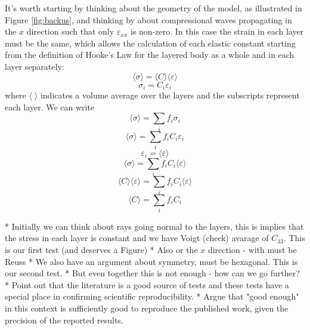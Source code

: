 \documentclass[11pt, oneside]{article}   	%
\begin{document}
It's worth starting by thinking about the geometry of the model, as illustrated in Figure \ref{fig:backus}, 
and thinking by about compressional waves propagating in the $x$ direction such that only $\varepsilon_{xx}$
is non-zero. In this case the strain in each layer must be the same, which allows the calculation of each
elastic constant starting from the definition of Hooke's Law for the layered body as a whole and in each layer separately:
\begin{equation}
\langle \sigma \rangle = \langle C \rangle \langle \varepsilon \rangle
\end{equation}
\begin{equation}
\sigma_i = C_i \varepsilon_i
\end{equation}
where $\langle \; \rangle$ indicates a volume average over the layers and the subscripts represent each layer. 
We can write 
\begin{equation}
\langle \sigma \rangle = \sum_i f_i \sigma_i
\end{equation}
\begin{equation}
\langle \sigma \rangle = \sum_i f_i C_i \varepsilon_i
\end{equation}
\begin{equation}
\varepsilon_i =  \langle \varepsilon \rangle
\end{equation}
\begin{equation}
\langle \sigma \rangle = \sum_i f_i C_i \langle \varepsilon \rangle
\end{equation}
\begin{equation}
\langle C \rangle \langle \varepsilon \rangle = \sum_i f_i C_i \langle \varepsilon \rangle
\end{equation}
\begin{equation}
\langle C \rangle = \sum_i f_i C_i 
\end{equation}

* Initially we can think about rays going normal to the layers, this is 
implies that the stress in each layer is constant and we have Voigt (check)
avarage of $C_{33}$. This is our first test (and deserves a Figure)
* Also or the $x$ direction - with must be Reuss
* We also have an argument about symmetry, must be hexagonal. This is our
second test.
* But even together this is not enough - how can we go further?
* Point out that the literature is a good source of tests and these
tests have a special place in confirming scientific reproducibility.
* Argue that "good enough" in this context is sufficiently good to 
reproduce the published work, given the precision of the reported results.
\end{document}
